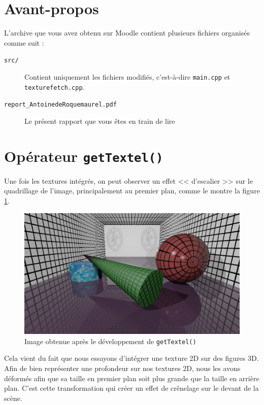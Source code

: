 \documentclass[a4paper, 11pt]{article}
\begin{document}
	\maketitle
	\section{Avant-propos}
	L'archive que vous avez obtenu sur Moodle contient plusieurs fichiers organisés comme suit : 
	\begin{description}
		\item[\texttt{src/}] Contient uniquement les fichiers modifiés, c'est-à-dire \texttt{main.cpp} et \texttt{texturefetch.cpp}.
		\item[\texttt{report\_AntoinedeRoquemaurel.pdf}] Le présent rapport que vous êtes en train de lire
	\end{description}
	\section{Opérateur \texttt{getTextel()}}
	Une fois les textures intégrés, on peut observer un effet << d'escalier >> sur le quadrillage de l'image, principalement au premier plan, comme le montre la
	figure \ref{fig:fig1}. 

	\begin{figure}[H]
		\centering
		\includegraphics[width=12cm]{1-monimage.png}
		\caption{Image obtenue après le développement de \texttt{getTextel()}}
		\label{fig:fig1}
	\end{figure}
	Cela vient du fait que nous essayons d'intégrer une texture 2D sur des figures 3D. Afin de bien représenter une profondeur sur nos textures 2D, nous les
	avons déformés afin que sa taille en premier plan soit plus grande que la taille en arrière plan. C'est cette transformation qui créer un effet de crênelage
	sur le devant de la scène.
\end{document}
